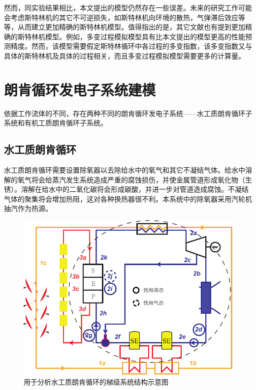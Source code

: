 然而，同实验结果相比，本文提出的模型仍然存在一些误差。未来的研究工作可能会考虑斯特林机的其它不可逆损失，如斯特林机向环境的散热，气弹滞后效应等等，从而建立更加精确的斯特林机模型。值得指出的是，其它文献也有提到更加精确的斯特林机模型。例如，多变过程模拟模型具有比本文提出的模型更高的性能预测精度\cite{Hosseinzade2015, Babaelahi2015}。然而，该模型需要假定斯特林循环中各过程的多变指数，该多变指数又与具体的斯特林机及具体的过程相关，而且多变过程模拟模型需要更多的计算量。

\section{朗肯循环发电子系统建模}
依据工作流体的不同，存在两种不同的朗肯循环发电子系统——水工质朗肯循环子系统和有机工质朗肯循环子系统。

\subsection{水工质朗肯循环}
  
  水工质朗肯循环需要设置除氧器以去除给水中的氧气和其它不凝结气体。给水中溶解的氧气将会给蒸汽发生系统造成严重的腐蚀损伤，并使金属管道形成氧化物（生锈）。溶解在给水中的二氧化碳将会形成碳酸，并进一步对管道造成腐蚀。不凝结气体的聚集将会增加热阻，这对各种换热器很不利。本系统中的除氧器采用汽轮机抽汽作为热源。
  
\begin{figure}[!ht]
\begin{center}
	\includegraphics[width = 0.8\columnwidth]{fig/SRCinCS}
	\caption{用于分析水工质朗肯循环的梯级系统结构示意图}
	\label{fig:SRCinCS}
\end{center}
\end{figure}
  
